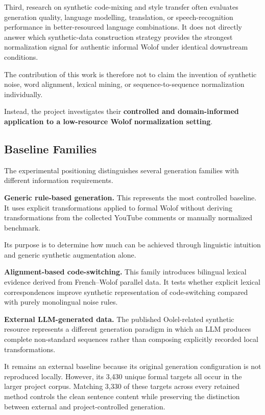 \documentclass[12pt, a4paper, twoside, openany]{report}
\begin{document}
Third, research on synthetic code-mixing and style transfer often evaluates generation quality, language modelling, translation, or speech-recognition performance in better-resourced language combinations. It does not directly answer which synthetic-data construction strategy provides the strongest normalization signal for authentic informal Wolof under identical downstream conditions.

The contribution of this work is therefore not to claim the invention of synthetic noise, word alignment, lexical mining, or sequence-to-sequence normalization individually.

Instead, the project investigates their \textbf{controlled and domain-informed application to a low-resource Wolof normalization setting}.


\subsection{Baseline Families}

The experimental positioning distinguishes several generation families with different information requirements.

\noindent\textbf{Generic rule-based generation.}
This represents the most controlled baseline. It uses explicit transformations applied to formal Wolof without deriving transformations from the collected YouTube comments or manually normalized benchmark.

Its purpose is to determine how much can be achieved through linguistic intuition and generic synthetic augmentation alone.

\noindent\textbf{Alignment-based code-switching.}
This family introduces bilingual lexical evidence derived from French--Wolof parallel data. It tests whether explicit lexical correspondences improve synthetic representation of code-switching compared with purely monolingual noise rules.

\noindent\textbf{External LLM-generated data.}
The published Oolel-related synthetic resource represents a different generation paradigm in which an \ac{LLM} produces complete non-standard sequences rather than composing explicitly recorded local transformations.

It remains an external baseline because its original generation configuration is not reproduced locally. However, its 3,430 unique formal targets all occur in the larger project corpus. Matching 3,330 of these targets across every retained method controls the clean sentence content while preserving the distinction between external and project-controlled generation.
\end{document}

